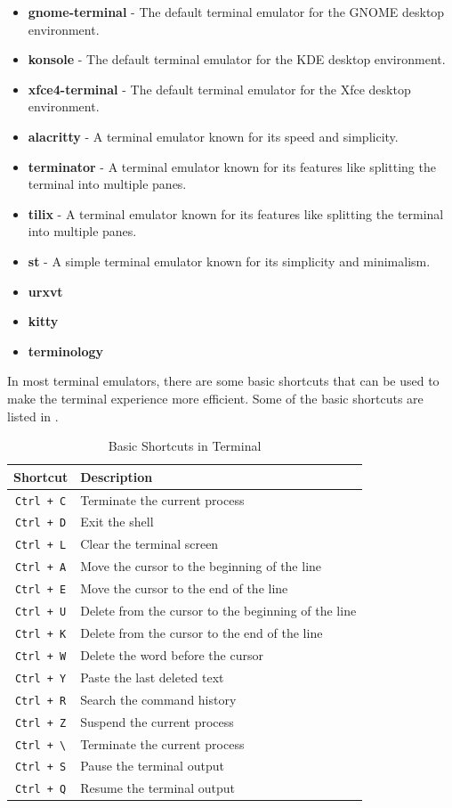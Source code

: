 \begin{itemize}
  \item
    \textbf{gnome-terminal} - The default terminal emulator for the GNOME desktop environment.
  \item
    \textbf{konsole} - The default terminal emulator for the KDE desktop environment.
  \item
    \textbf{xfce4-terminal} - The default terminal emulator for the Xfce desktop environment.
  \item
    \textbf{alacritty} - A terminal emulator known for its speed and simplicity.
  \item
    \textbf{terminator} - A terminal emulator known for its features like splitting the terminal into multiple panes.
  \item
    \textbf{tilix} - A terminal emulator known for its features like splitting the terminal into multiple panes.
  \item
    \textbf{st} - A simple terminal emulator known for its simplicity and minimalism.
  \item \textbf{urxvt}
  \item \textbf{kitty}
  \item \textbf{terminology}
\end{itemize}

In most terminal emulators, there are some basic shortcuts that can be used to make the terminal experience more efficient.
Some of the basic shortcuts are listed in .

\begin{table}[h!]
\caption{Basic Shortcuts in Terminal}
\begin{tabular}{ c l }
  \toprule
 Shortcut & Description \\
 \midrule
  \texttt{Ctrl + C} & Terminate the current process\\
  \texttt{Ctrl + D} & Exit the shell \\
  \texttt{Ctrl + L} & Clear the terminal screen \\
  \texttt{Ctrl + A} & Move the cursor to the beginning of the line \\
  \texttt{Ctrl + E} & Move the cursor to the end of the line \\
  \texttt{Ctrl + U} & Delete from the cursor to the beginning of the line \\
  \texttt{Ctrl + K} & Delete from the cursor to the end of the line \\
  \texttt{Ctrl + W} & Delete the word before the cursor \\
  \texttt{Ctrl + Y} & Paste the last deleted text \\
  \texttt{Ctrl + R} & Search the command history \\
  \texttt{Ctrl + Z} & Suspend the current process \\
  \texttt{Ctrl + \textbackslash} & Terminate the current process \\
  \texttt{Ctrl + S} & Pause the terminal output \\
  \texttt{Ctrl + Q} & Resume the terminal output \\
  \bottomrule
\end{tabular}
\end{table}


